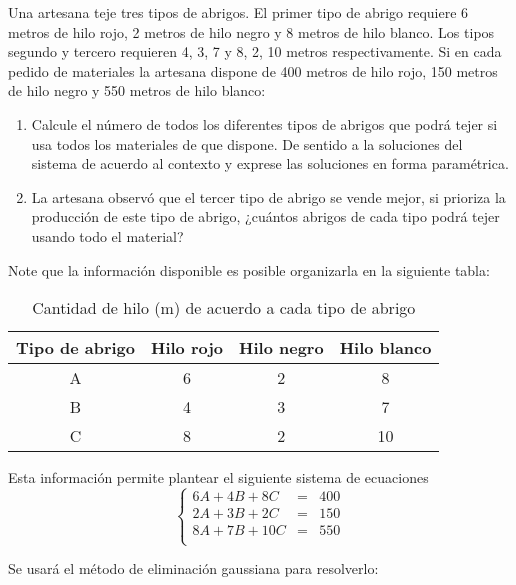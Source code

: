 \begin{prob} 
Una artesana teje tres tipos de abrigos. El primer tipo de abrigo requiere 6 metros de hilo rojo, 2 metros de hilo negro y 8 metros de hilo blanco. Los tipos segundo y tercero requieren 4, 3, 7 y 8, 2, 10 metros respectivamente. Si en cada pedido de materiales la artesana dispone de 400 metros de hilo rojo, 150 metros de hilo negro y 550 metros de hilo blanco: 

\begin{enumerate}[$(a)$]
\item Calcule el número de todos los diferentes tipos de abrigos que podrá tejer si usa todos los materiales de que dispone. De sentido a la soluciones del sistema de acuerdo al contexto y exprese las soluciones en forma paramétrica.
 \item La artesana observó que el tercer tipo de abrigo se vende mejor, si prioriza la producción de este tipo de abrigo, ¿cuántos abrigos de cada tipo podrá tejer usando todo el material?
 \end{enumerate} 

\begin{myproof} 
Note que la información disponible es posible organizarla en la siguiente tabla: 

\begin{table}[H]
\centering
\begin{tabular}{|c|c|c|c|} \hline Tipo de abrigo&Hilo rojo&Hilo negro&Hilo blanco\\\hline
A&6&2&8\\\hline
B&4&3&7\\\hline
C&8&2&10\\\hline
\end{tabular}
\caption{Cantidad de hilo (m) de acuerdo a cada tipo de abrigo}
\end{table}

Esta información permite plantear el siguiente sistema de ecuaciones 
$$\left\lbrace \begin{array}{ccc}
6A+4B+8C&=&400\\
2A+3B+2C&=&150\\
8A+7B+10C&=&550\\
\end{array} \right.$$

Se usará el método de eliminación gaussiana para resolverlo:


\end{myproof}
\end{prob}
